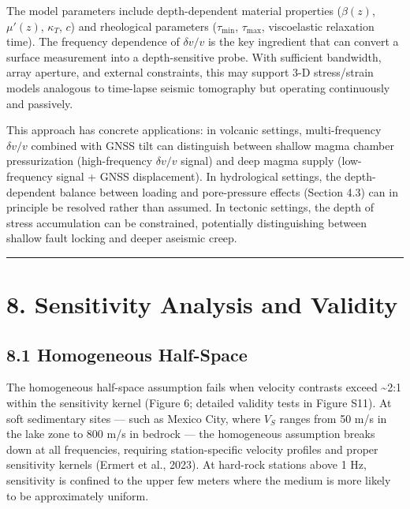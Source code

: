 \documentclass[12pt]{article}
\begin{document}
The model parameters include depth-dependent material properties
(\(\beta(z)\), \(\mu'(z)\), \(\kappa_T\), \(c\)) and rheological
parameters (\(\tau_{\min}\), \(\tau_{\max}\), viscoelastic relaxation
time). The frequency dependence of \(\delta v/v\) is the key ingredient
that can convert a surface measurement into a depth-sensitive probe.
With sufficient bandwidth, array aperture, and external constraints,
this may support 3-D stress/strain models analogous to time-lapse
seismic tomography but operating continuously and passively.

This approach has concrete applications: in volcanic settings,
multi-frequency \(\delta v/v\) combined with GNSS tilt can distinguish
between shallow magma chamber pressurization (high-frequency
\(\delta v/v\) signal) and deep magma supply (low-frequency signal +
GNSS displacement). In hydrological settings, the depth-dependent
balance between loading and pore-pressure effects (Section 4.3) can in
principle be resolved rather than assumed. In tectonic settings, the
depth of stress accumulation can be constrained, potentially
distinguishing between shallow fault locking and deeper aseismic creep.

\begin{center}\rule{0.5\linewidth}{0.5pt}\end{center}

\section{8. Sensitivity Analysis and
Validity}\label{sensitivity-analysis-and-validity}

\subsection{8.1 Homogeneous Half-Space}\label{homogeneous-half-space}

The homogeneous half-space assumption fails when velocity contrasts
exceed \textasciitilde{}2:1 within the sensitivity kernel (Figure 6;
detailed validity tests in Figure S11). At soft sedimentary sites ---
such as Mexico City, where \(V_S\) ranges from 50 m/s in the lake zone
to 800 m/s in bedrock --- the homogeneous assumption breaks down at all
frequencies, requiring station-specific velocity profiles and proper
sensitivity kernels (Ermert et al., 2023). At hard-rock stations above 1
Hz, sensitivity is confined to the upper few meters where the medium is
more likely to be approximately uniform.
\end{document}
